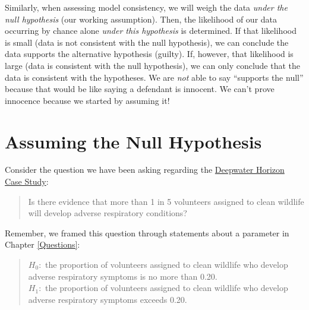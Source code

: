 \documentclass[]{book}
\theoremstyle{definition}
\theoremstyle{definition}
\theoremstyle{definition}
\theoremstyle{remark}
\begin{document}
Similarly, when assessing model consistency, we will weigh the data
\emph{under the null hypothesis} (our working assumption). Then, the
likelihood of our data occurring by chance alone \emph{under this
hypothesis} is determined. If that likelihood is small (data is not
consistent with the null hypothesis), we can conclude the data supports
the alternative hypothesis (guilty). If, however, that likelihood is
large (data is consistent with the null hypothesis), we can only
conclude that the data is consistent with the hypotheses. We are
\emph{not} able to say ``supports the null'' because that would be like
saying a defendant is innocent. We can't prove innocence because we
started by assuming it!

\section{Assuming the Null
Hypothesis}\label{assuming-the-null-hypothesis}

Consider the question we have been asking regarding the
\protect\hyperlink{CaseDeepwater}{Deepwater Horizon Case Study}:

\begin{quote}
Is there evidence that more than 1 in 5 volunteers assigned to clean
wildlife will develop adverse respiratory conditions?
\end{quote}

Remember, we framed this question through statements about a parameter
in Chapter \ref{Questions}:

\begin{quote}
\(H_0:\) the proportion of volunteers assigned to clean wildlife who
develop adverse respiratory symptoms is no more than 0.20.\\
\(H_1:\) the proportion of volunteers assigned to clean wildlife who
develop adverse respiratory symptoms exceeds 0.20.
\end{quote}
\end{document}
